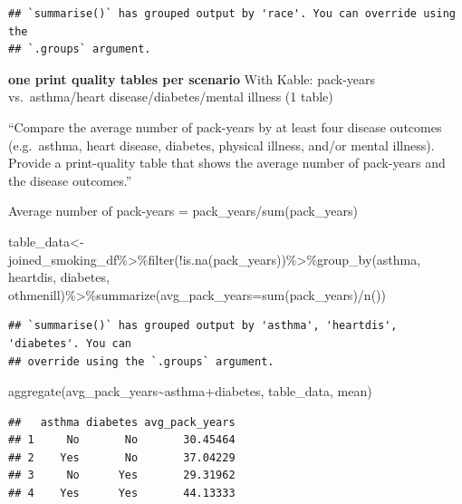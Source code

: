\documentclass[
]{article}
\newenvironment{Shaded}{\begin{snugshade}}{\end{snugshade}}
\newcommand{\AttributeTok}[1]{\textcolor[rgb]{0.77,0.63,0.00}{#1}}
\newcommand{\FunctionTok}[1]{\textcolor[rgb]{0.00,0.00,0.00}{#1}}
\newcommand{\NormalTok}[1]{#1}
\newcommand{\OtherTok}[1]{\textcolor[rgb]{0.56,0.35,0.01}{#1}}
\newcommand{\SpecialCharTok}[1]{\textcolor[rgb]{0.00,0.00,0.00}{#1}}
\begin{document}
\begin{verbatim}
## `summarise()` has grouped output by 'race'. You can override using the
## `.groups` argument.
\end{verbatim}

\newpage

\textbf{one print quality tables per scenario} With Kable: pack-years
vs.~asthma/heart disease/diabetes/mental illness (1 table)

``Compare the average number of pack-years by at least four disease
outcomes (e.g.~asthma, heart disease, diabetes, physical illness, and/or
mental illness). Provide a print-quality table that shows the average
number of pack-years and the disease outcomes.''

Average number of pack-years = pack\_years/sum(pack\_years)

\begin{Shaded}
\begin{Highlighting}[]
\NormalTok{table\_data}\OtherTok{\textless{}{-}}\NormalTok{joined\_smoking\_df}\SpecialCharTok{\%\textgreater{}\%}\FunctionTok{filter}\NormalTok{(}\SpecialCharTok{!}\FunctionTok{is.na}\NormalTok{(pack\_years))}\SpecialCharTok{\%\textgreater{}\%}\FunctionTok{group\_by}\NormalTok{(asthma, heartdis, diabetes, othmenill)}\SpecialCharTok{\%\textgreater{}\%}\FunctionTok{summarize}\NormalTok{(}\AttributeTok{avg\_pack\_years=}\FunctionTok{sum}\NormalTok{(pack\_years)}\SpecialCharTok{/}\FunctionTok{n}\NormalTok{())}
\end{Highlighting}
\end{Shaded}

\begin{verbatim}
## `summarise()` has grouped output by 'asthma', 'heartdis', 'diabetes'. You can
## override using the `.groups` argument.
\end{verbatim}

\begin{Shaded}
\begin{Highlighting}[]
\FunctionTok{aggregate}\NormalTok{(avg\_pack\_years}\SpecialCharTok{\textasciitilde{}}\NormalTok{asthma}\SpecialCharTok{+}\NormalTok{diabetes, table\_data, mean)}
\end{Highlighting}
\end{Shaded}

\begin{verbatim}
##   asthma diabetes avg_pack_years
## 1     No       No       30.45464
## 2    Yes       No       37.04229
## 3     No      Yes       29.31962
## 4    Yes      Yes       44.13333
\end{verbatim}
\end{document}
